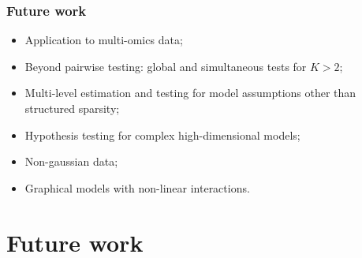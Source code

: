\documentclass[10pt]{beamer}
\theoremstyle{definition}
\begin{document}
\begin{frame}
\frametitle{Future work}

\begin{itemize}
\item {\colbbf Application to multi-omics data};
\vspace{1em}

\item Beyond pairwise testing: global and simultaneous tests for $K > 2$;

\vspace{1em}
\item Multi-level estimation and testing for model assumptions other than structured sparsity;

\vspace{1em}
\item Hypothesis testing for complex high-dimensional models;

\vspace{1em}
\item Non-gaussian data;

\vspace{1em}
\item {\colbbf Graphical models with non-linear interactions}.
\end{itemize}
\end{frame}
\section{Future work}
\end{document}
